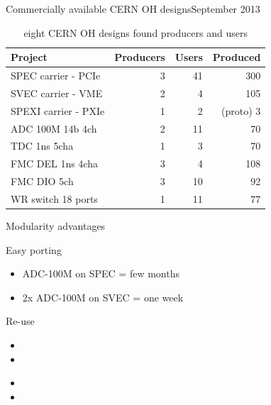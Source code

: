 \documentclass[compress,red]{beamer}
\begin{document}
\begin{frame}{Commercially available CERN OH designs}{September 2013}

  \begin{table}
    \centering

    \begin{tabular}{|l||r|r|r|}
      \hline
      Project & Producers & Users & Produced\\
      \hline\hline
      SPEC carrier - PCIe & 3 & 41 & 300 \\
      \hline
      SVEC carrier - VME & 2 & 4 & 105 \\
      \hline
      SPEXI carrier - PXIe & 1 & 2 & (proto) 3 \\
      \hline
      \hline
      ADC 100M 14b 4ch & 2 & 11 & 70 \\
      \hline
      TDC 1ns 5cha & 1 & 3 & 70 \\
      \hline
      FMC DEL 1ns 4cha & 3 & 4 & 108 \\
      \hline
      FMC DIO 5ch & 3 & 10 & 92 \\
      \hline
      WR switch 18 ports & 1 & 11 & 77 \\
      \hline
    \end{tabular}

    \caption{eight CERN OH designs found producers and users}
  \end{table}

\end{frame}

\begin{frame}{Modularity advantages}

  \begin{block}{Easy porting}
    \begin{itemize}
    \item ADC-100M on SPEC = few months
    \item 2x ADC-100M on SVEC = one week
    \end{itemize}
  \end{block}

  \begin{block}{Re-use}
    \begin{itemize}
    \item 
    \item 
    \end{itemize}
  \end{block}

  \begin{block}{}
    \begin{itemize}
    \item 
    \item 
    \end{itemize}
  \end{block}

\end{frame}
\end{document}
